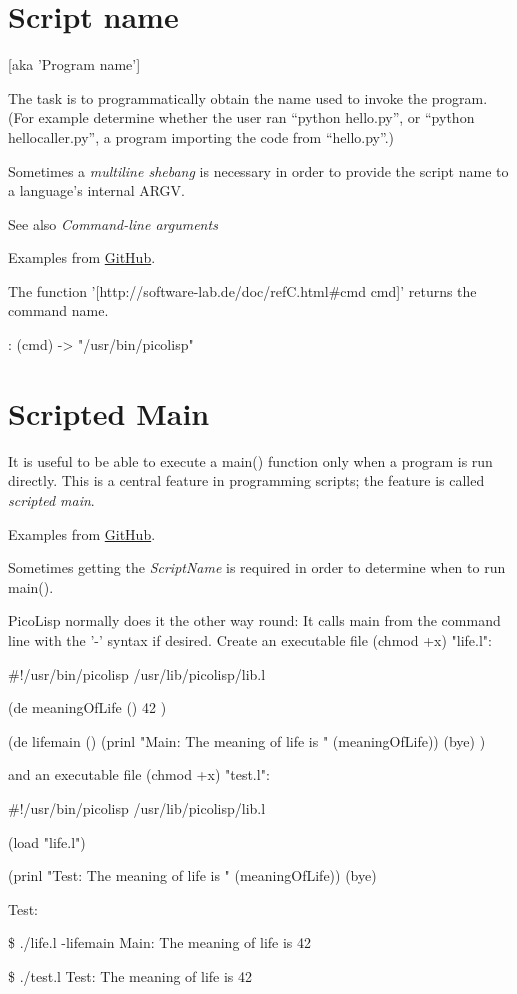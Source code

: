 \pagebreak{}
\section*{Script name}
[aka 'Program name']

The task is to programmatically obtain the name used to invoke the
program. (For example determine whether the user ran ``python
hello.py'', or ``python hellocaller.py'', a program importing the code
from ``hello.py''.)

Sometimes a \emph{multiline shebang} is necessary in order to provide
the script name to a language's internal ARGV.

See also \emph{Command-line arguments}

Examples from \href{https://github.com/mcandre/scriptname}{GitHub}.

\begin{wideverbatim}

The function '[http://software-lab.de/doc/refC.html#cmd cmd]' returns the
command name.

: (cmd)
-> "/usr/bin/picolisp"

\end{wideverbatim}

\pagebreak{}
\section*{Scripted Main}

It is useful to be able to execute a main() function only when a program
is run directly. This is a central feature in programming scripts; the
feature is called \emph{scripted main}.

Examples from \href{https://github.com/mcandre/scriptedmain}{GitHub}.

Sometimes getting the \emph{ScriptName} is required in order to
determine when to run main().

\begin{wideverbatim}

PicoLisp normally does it the other way round: It calls main from the command
line with the '-' syntax if desired. Create an executable file (chmod +x)
"life.l":

#!/usr/bin/picolisp /usr/lib/picolisp/lib.l

(de meaningOfLife ()
   42 )

(de lifemain ()
   (prinl "Main: The meaning of life is " (meaningOfLife))
   (bye) )

and an executable file (chmod +x) "test.l":

#!/usr/bin/picolisp /usr/lib/picolisp/lib.l

(load "life.l")

(prinl "Test: The meaning of life is " (meaningOfLife))
(bye)

Test:

\$ ./life.l -lifemain
Main: The meaning of life is 42

\$ ./test.l
Test: The meaning of life is 42

\end{wideverbatim}

